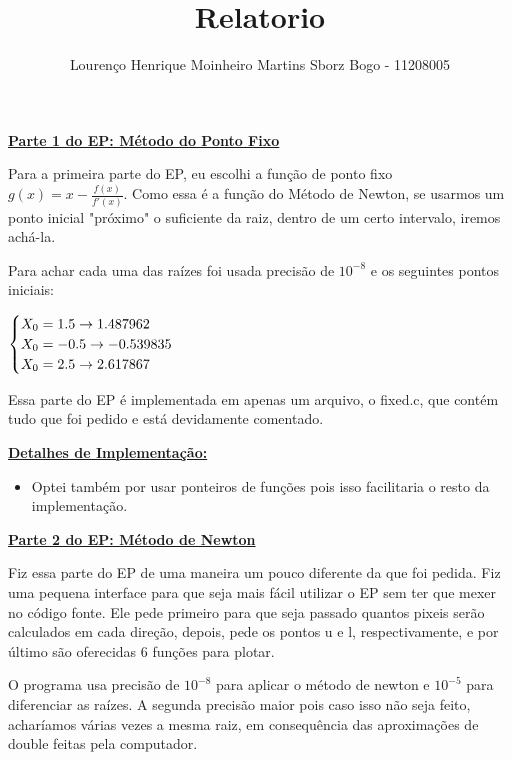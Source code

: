 \documentclass[12pt]{article}
\title{Relatorio}
\author{Lourenço Henrique Moinheiro Martins Sborz Bogo - 11208005}
\date{}
\newcommand{\mytitle}[1]{\textbf{\underline{#1}}}
\begin{document}
\maketitle

\mytitle{Parte 1 do EP: Método do Ponto Fixo}

Para a primeira parte do EP, eu escolhi a função de ponto fixo $g(x) = x - \frac{f(x)}{f'(x)}$. Como essa é a função do Método de Newton, se usarmos um ponto inicial "próximo" o suficiente da raiz, dentro de um certo intervalo, iremos achá-la.

Para achar cada uma das raízes foi usada precisão de $10^{-8}$ e os seguintes pontos iniciais:

$
\begin{cases}
  
  X_0 = 1.5 \to 1.487962 \\
  X_0 = -0.5 \to -0.539835 \\
  X_0 = 2.5 \to 2.617867 \\
  
\end{cases}\\
$

Essa parte do EP é implementada em apenas um arquivo, o fixed.c, que contém tudo que foi pedido e está devidamente comentado.

\mytitle{Detalhes de Implementação:}

\begin{itemize}

\item Optei também por usar ponteiros de funções pois isso facilitaria o resto da implementação.

\end{itemize}

\mytitle{Parte 2 do EP: Método de Newton}

Fiz essa parte do EP de uma maneira um pouco diferente da que foi pedida. Fiz uma pequena interface para que seja mais fácil utilizar o EP sem ter que mexer no código fonte. Ele pede primeiro para que seja passado quantos pixeis serão calculados em cada direção, depois, pede os pontos u e l, respectivamente, e por último são oferecidas 6 funções para plotar.

O programa usa precisão de $10^{-8}$ para aplicar o método de newton e $10^{-5}$ para diferenciar as raízes. A segunda precisão maior pois caso isso não seja feito, acharíamos várias vezes a mesma raiz, em consequência das aproximações de double feitas pela computador.
\end{document}
